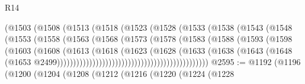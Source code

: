 \begin{lexlean}{R14}
\begin{coremodule}
                                    (@1503
                                      (@1508
                                        (@1513
                                          (@1518
                                            (@1523
                                              (@1528
                                                (@1533
                                                  (@1538
                                                    (@1543
                                                      (@1548
                                                        (@1553
                                                          (@1558
                                                            (@1563
                                                              (@1568
                                                                (@1573
                                                                  (@1578
                                                                    (@1583
                                                                      (@1588
                                                                        (@1593
                                                                          (@1598
                                                                            (@1603
                                                                              (@1608
                                                                                (@1613
                                                                                  (@1618
                                                                                    (@1623
                                                                                      (@1628
                                                                                        (@1633
                                                                                          (@1638
                                                                                            (@1643
                                                                                              (@1648
                                                                                                (@1653
                                                                                                  @2499)))))))))))))))))))))))))))))))))))))))))))))))
@2595 := @1192
    (@1196
      (@1200
        (@1204
          (@1208
            (@1212
              (@1216
                (@1220
                  (@1224
                    (@1228

\end{coremodule}
\end{lexlean}
